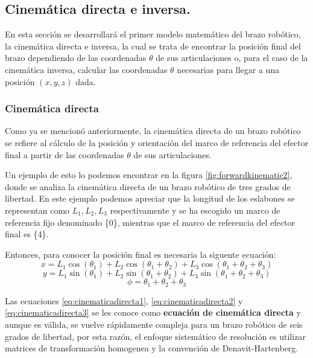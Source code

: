 \subsection{Cinemática directa e inversa.}

En esta sección se desarrollará el primer modelo matemático del brazo robótico, la cinemática directa e inversa, la cual se trata de encontrar la posición final del brazo dependiendo de las coordenadas $\theta$ de sus articulaciones o, para el caso de la cinemática inversa, calcular las coordenadas $\theta$ necesarias para llegar a una posición $(x,y,z)$ dada.

\subsubsection{Cinemática directa} 
Como ya se mencionó anteriormente, la cinemática directa de un brazo robótico se refiere al cálculo de la posición y orientación del marco de referencia del efector final a partir de las coordenadas $\theta$ de sus articulaciones. \cite{University2017}

Un ejemplo de esto lo podemos encontrar en la figura \ref{fig:forwardkinematic2}, donde se analiza la cinemática directa de un brazo robótico de tres grados de libertad. En este ejemplo podemos apreciar que la longitud de los eslabones se representan como $L_1, L_2, L_3$ respectivamente y se ha escogido un marco de referencia fijo denominado \{0\}, mientras que el marco de referencia del efector final es \{4\}. \cite{University2017}

Entonces, para conocer la posición final es necesaria la siguente ecuación:
\begin{equation}
\label{eq:cinematicadirecta1}
x = L_1 \cos(\theta_1)+L_2 \cos(\theta_1 + \theta_2)+ L_3 \cos(\theta_1 + \theta_2 + \theta_3)
\end{equation}
\begin{equation}
\label{eq:cinematicadirecta2}
y = L_1 \sin(\theta_1)+L_2 \sin(\theta_1 + \theta_2)+ L_3 \sin(\theta_1 + \theta_2 + \theta_3)
\end{equation}
\begin{equation}
\label{eq:cinematicadirecta3}
\phi = \theta_1 + \theta_2 + \theta_3
\end{equation}

Las ecuaciones \ref{eq:cinematicadirecta1}, \ref{eq:cinematicadirecta2} y \ref{eq:cinematicadirecta3} se les conoce como \textbf{ecuación de cinemática directa} y aunque es válida, se vuelve rápidamente compleja para un brazo robótico de seis grados de libertad, por esta razón, el enfoque sistemático de resolución es utilizar matrices de transformación homogenea y la convención de Denavit-Hartenberg.

